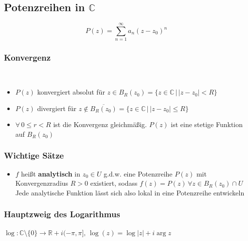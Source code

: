 \subsection{Potenzreihen in $\mathbb C$}
\begin{emphbox}
    \begin{equation*}
        P(z) = \sum_{n=1}^{\infty}a_n(z-z_0)^n
    \end{equation*}
\end{emphbox}
\begin{sectionbox}
    \subsubsection{Konvergenz}
    \begin{center}
         \\
    \end{center}

    \begin{itemize}
        \item $P(z)$ konvergiert absolut für $z\in B_R(z_0) = \{z\in\mathbb C \, | \, |z-z_0| < R \}$
        \item $P(z)$ divergiert für $z\notin \overline{B_R(z_0)} = \{z\in\mathbb C \, | \, |z-z_0| \le R \}$
        \item $\forall \, 0 \le r < R$ ist die Konvergenz gleichmäßig. $P(z)$ ist eine stetige Funktion auf $B_R(z_0)$
    \end{itemize}
\end{sectionbox}

\begin{sectionbox}
    \subsubsection{Wichtige Sätze}
    \begin{itemize}
        \item $f$ heißt \textbf{analytisch} in $z_0\in U$ g.d.w. eine Potenzreihe $P(z)$ mit Konvergenzradius $R>0$ existiert, sodass $f(z)=P(z) \, \forall z\in B_R(z_0) \cap U$ \\
              Jede analytische Funktion lässt sich also lokal in eine Potenzreihe entwickeln
    \end{itemize}

    \subsubsection*{Hauptzweig des Logarithmus}
    $\log : \mathbb C\setminus\{0\} \rightarrow \mathbb R + i(-\pi, \pi], \, \log(z) = \log|z| + i\arg{z}$
\end{sectionbox}

